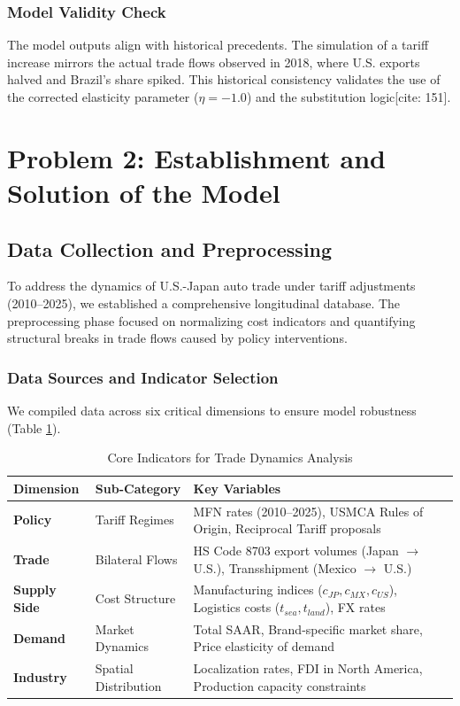 \documentclass{apmcmthesis}
\begin{document}
\subsubsection{Model Validity Check}
The model outputs align with historical precedents. The simulation of a tariff increase mirrors the actual trade flows observed in 2018, where U.S. exports halved and Brazil's share spiked. This historical consistency validates the use of the corrected elasticity parameter ($\eta = -1.0$) and the substitution logic[cite: 151].


\section{Problem 2: Establishment and Solution of the Model}

\subsection{Data Collection and Preprocessing}
To address the dynamics of U.S.-Japan auto trade under tariff adjustments (2010--2025), we established a comprehensive longitudinal database. The preprocessing phase focused on normalizing cost indicators and quantifying structural breaks in trade flows caused by policy interventions.

\subsubsection{Data Sources and Indicator Selection}
We compiled data across six critical dimensions to ensure model robustness (Table \ref{tab:q2_data_indicators}).

\begin{table}[H]
\centering
\caption{Core Indicators for Trade Dynamics Analysis}
\begin{tabular}{l>{\raggedright\arraybackslash}p{3.5cm}>{\raggedright\arraybackslash}p{7.5cm}}
\toprule
\textbf{Dimension} & \textbf{Sub-Category} & \textbf{Key Variables} \\
\midrule
\textbf{Policy} & Tariff Regimes & MFN rates (2010--2025), USMCA Rules of Origin, Reciprocal Tariff proposals \\
\textbf{Trade} & Bilateral Flows & HS Code 8703 export volumes (Japan $\to$ U.S.), Transshipment (Mexico $\to$ U.S.) \\
\textbf{Supply Side} & Cost Structure & Manufacturing indices ($c_{JP}, c_{MX}, c_{US}$), Logistics costs ($t_{sea}, t_{land}$), FX rates \\
\textbf{Demand} & Market Dynamics & Total SAAR, Brand-specific market share, Price elasticity of demand \\
\textbf{Industry} & Spatial Distribution & Localization rates, FDI in North America, Production capacity constraints \\
\bottomrule
\end{tabular}
\label{tab:q2_data_indicators}
\end{table}
\end{document}
